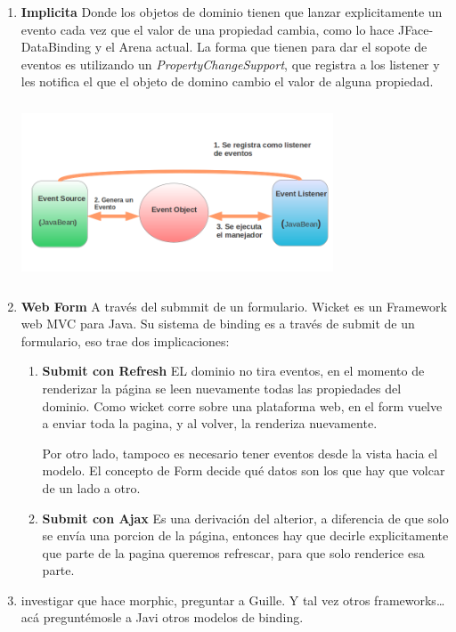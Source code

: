 \begin {enumerate}

	\item {\bf Implicita} Donde los objetos de dominio tienen que
	 lanzar explicitamente un evento cada vez que el valor de una propiedad cambia,
	 como lo hace JFace-DataBinding y el Arena actual.
	\cite{sousa00formal}
	La forma que tienen para dar el sopote de eventos es utilizando un
	\emph{PropertyChangeSupport}, que registra a los listener y les notifica el que
	el objeto de domino cambio el valor de alguna propiedad.
	
	\includegraphics[width=350px, height=200px]{img/javabeans}
	
	\bigskip
	
	\item {\bf Web Form} A través del submmit de un formulario. Wicket es
	un Framework web MVC para Java. Su sistema de binding  es a través de submit de un
	formulario, eso trae dos implicaciones:
	 
		\begin {enumerate}
		
			\item{\bf Submit con Refresh}  EL dominio no tira eventos, en el momento de
			renderizar la página se leen nuevamente todas las propiedades del dominio.
			Como wicket corre sobre una plataforma web, en el form vuelve a enviar toda
			la pagina, y al volver, la renderiza nuevamente.
			
			Por otro lado, tampoco es necesario tener eventos desde la vista hacia el
			modelo. El concepto de Form decide qué datos son los que hay que volcar de un
			lado a otro.

			\item {\bf Submit con Ajax} 
			Es una derivación del alterior, a diferencia de que solo se envía
			una porcion de la página, entonces hay que decirle explicitamente que parte
			de la pagina queremos refrescar, para que solo renderice esa parte.
		
		\end {enumerate}
		
		
	\item investigar que hace morphic, preguntar a Guille.
	Y tal vez otros frameworks\ldots acá preguntémosle a Javi otros modelos de
	binding.
\end{enumerate}	


